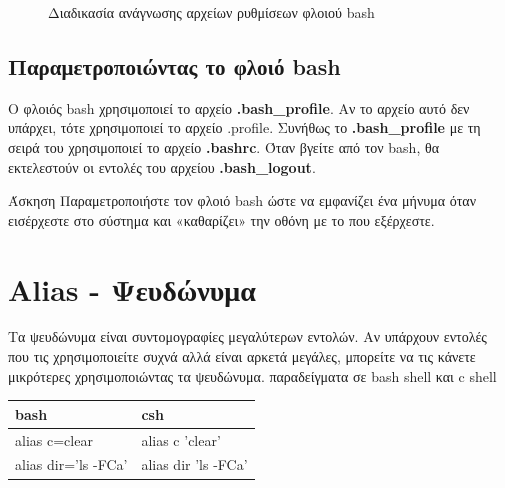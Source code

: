 \begin{figure}[ht]
	\centering
	\caption{Διαδικασία ανάγνωσης αρχείων ρυθμίσεων φλοιού bash}
	\label{fig:startup_scripts}
\end{figure} 

\subsection{Παραμετροποιώντας το φλοιό bash}

Ο φλοιός bash χρησιμοποιεί το αρχείο \textbf{.bash\_profile}. Αν το αρχείο αυτό δεν υπάρχει, τότε χρησιμοποιεί το αρχείο .profile. Συνήθως
το \textbf{.bash\_profile} με τη σειρά του χρησιμοποιεί το αρχείο \textbf{.bashrc}. Όταν βγείτε από τον bash, θα εκτελεστούν οι εντολές του
αρχείου \textbf{.bash\_logout}.


\begin{exercisebox}{  Άσκηση}
 Παραμετροποιήστε τον φλοιό bash ώστε να εμφανίζει ένα μήνυμα όταν εισέρχεστε στο σύστημα και «καθαρίζει» την οθόνη με το που  εξέρχεστε.
\end{exercisebox}

\section*{Alias - Ψευδώνυμα}

Τα ψευδώνυμα είναι συντομογραφίες μεγαλύτερων εντολών. Αν υπάρχουν εντολές που τις χρησιμοποιείτε συχνά αλλά είναι αρκετά μεγάλες, μπορείτε
να τις κάνετε μικρότερες
χρησιμοποιώντας τα ψευδώνυμα.
παραδείγματα σε bash shell και c shell

\begin{center}
	\begin{tabular}{ l | l }
		bash			&	csh \\
		\hline
		alias c=clear		&	alias c 'clear' \\
		alias dir='ls -FCa'	&	alias dir 'ls -FCa' \\
	\end{tabular} 
\end{center}

